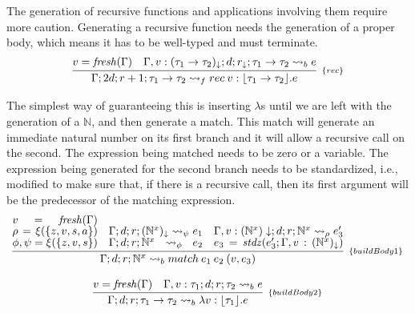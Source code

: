 \documentclass[runningheads]{llncs}
\newcommand{\tN}{\mathbb{N}}
\begin{document}
\noindent The generation of recursive functions and applications 
involving them require more caution. Generating a recursive 
function needs the generation of a proper body, which means 
it has to be well-typed and must terminate. 
\[
\begin{array}{c}
\infer[_{\{rec\}}]{\Gamma; 2d; r+1; \tau_1 \rightarrow \tau_2 \leadsto_f rec \: v : \lfloor \tau_1 \rightarrow \tau_2 \rfloor . e}{v = \mathit{fresh}(\Gamma) & \Gamma , v : (\tau_1 \rightarrow \tau_2)_\downarrow; d; r_\downarrow; \tau_1 \rightarrow \tau_2 \leadsto_b e}
\end{array}
\]

\noindent The simplest way 
of guaranteeing this is inserting $\lambda$s until we are 
left with the generation of a $\tN$, and then generate a 
match. This match will generate an immediate natural number on its 
first branch and it will allow a recursive call on the second. The 
expression being matched needs to be zero or a variable.
The expression being generated for the second branch needs 
to be standardized, i.e., modified to make sure that, if 
there is a recursive call, then its first argument will be 
the predecessor of the matching expression.
\[
\begin{array}{c}
\infer[_{\{buildBody1\}}]{\Gamma; d; r; \tN^x \leadsto_b match \: e_1 \: e_2 \: (v, e_3)}{v = \mathit{fresh}(\Gamma) \\ \rho = \xi(\{z, v, s, a\}) & \Gamma; d; r; (\tN^x)_\downarrow \leadsto_{\psi} e_1 & \Gamma, v : (\tN^x)\downarrow; d; r; \tN^x \leadsto_{\rho} e_3' \\ \phi,\psi = \xi(\{z, v, s\})& \Gamma; d; r; \tN^x \leadsto_{\phi} e_2 & e_3 = \mathit{stdz}(e_3'; \Gamma , v : (\tN^x)_\downarrow)}\\\\
\infer[_{\{buildBody2\}}]{\Gamma; d; r; \tau_1 \rightarrow \tau_2 \leadsto_b \lambda v : \lfloor \tau_1 \rfloor . e}{v = \mathit{fresh}(\Gamma) & \Gamma, v : \tau_1; d; r; \tau_2 \leadsto_b e}
\end{array}
\]
\end{document}
